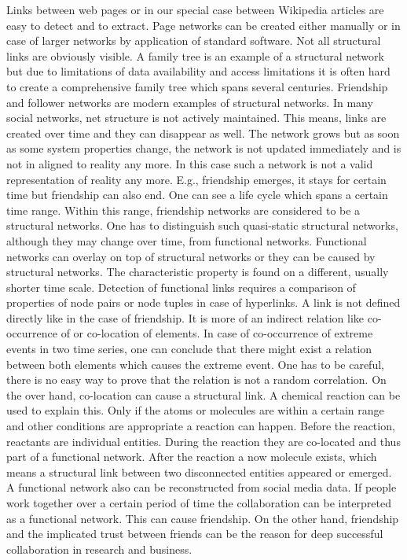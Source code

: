 \documentclass[a4paper,10pt]{scrbook}
\begin{document}
Links between web pages or in our special case between Wikipedia articles are easy to detect and to extract. Page networks can be created either manually or in case of larger networks by application of standard software. Not all structural links are obviously visible. A family tree is an example of a structural network but due to limitations of data availability and access limitations it is often hard to create a comprehensive family tree which spans several centuries. Friendship and follower networks are modern examples of structural networks. In many social networks, net structure is not actively maintained. This means, links are created over time and they can disappear as well. The network grows but as soon as some system properties change, the network is not updated immediately and is not in aligned to reality any more. In this case such a network is not a valid representation of reality any more. E.g., friendship emerges, it stays for certain time but friendship can also end. One can see a life cycle which spans a certain time range. Within this range, friendship networks are considered to be a structural networks. One has to distinguish such quasi-static structural networks, although they may change over time, from functional networks. Functional networks can overlay on top of structural networks or they can be caused by structural networks. The characteristic property is found on a different, usually shorter time scale. Detection of functional links requires a comparison of properties of node pairs or node tuples in case of hyperlinks. A link is not defined directly like in the case of friendship. It is more of an indirect relation like co-occurrence of or co-location of elements. In case of co-occurrence of extreme events in two time series, one can conclude that there might exist a relation between both elements which causes the extreme event. One has to be careful, there is no easy way to prove that the relation is not a random correlation. On the over hand, co-location can cause a structural link. A chemical reaction can be used to explain this. Only if the atoms or molecules are within a certain range and other conditions are appropriate a reaction can happen. Before the reaction, reactants are individual entities. During the reaction they are co-located and thus part of a functional network. After the reaction a now molecule exists, which means a structural link between two disconnected entities appeared or emerged. A functional network also can be reconstructed from social media data. If people work together over a certain period of time the collaboration can be interpreted as a functional network. This can cause friendship. On the other hand, friendship and the implicated trust between friends can be the reason for deep successful collaboration in research and business. 
\end{document}
